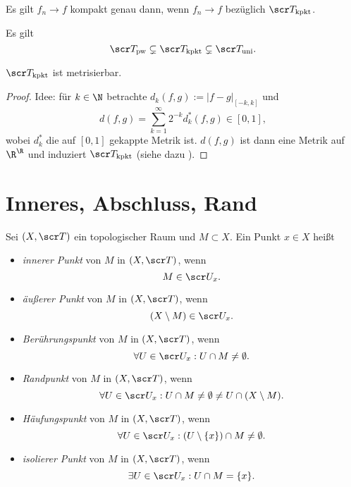 \begin{st}
	Es gilt $f_n \to f$ kompakt genau dann, wenn $f_n \to f$ bezüglich $\scr T_{\text{kpkt}}$.
\end{st}

\begin{nt}
	Es gilt
	\[
		\scr T_{\text{pw}} \subsetneq \scr T_{\text{kpkt}} \subsetneq \scr T_{\text{uni}}.
	\]
\end{nt}

\begin{st}
	$\scr T_{\text{kpkt}}$ ist metrisierbar.
	\begin{proof}
		Idee: für $k \in \N$ betrachte $d_k(f,g) := |f-g|_{[-k,k]}$ und
		\[
			d(f,g) = \sum_{k=1}^\infty 2^{-k} d_k^* (f,g) \in [0,1],
		\]
		wobei $d_k^*$ die auf $[0,1]$ gekappte Metrik ist.
		$d(f,g)$ ist dann eine Metrik auf $\R^\R$ und induziert $\scr T_{\text{kpkt}}$ (siehe dazu ).
	\end{proof}
\end{st}


\section{Inneres, Abschluss, Rand}


Sei $(X, \scr T)$ ein topologischer Raum und $M \subset X$.
Ein Punkt $x \in X$ heißt
\begin{itemize}
	\item
		\emph{innerer Punkt} von $M$ in $(X,\scr T)$, wenn
		\[
			M \in \scr U_x.
		\]
	\item
		\emph{äußerer Punkt} von $M$ in $(X,\scr T)$, wenn
		\[
			(X \setminus M) \in \scr U_x.
		\]
	\item
		\emph{Berührungspunkt} von $M$ in $(X, \scr T)$, wenn
		\[
			\forall U \in \scr U_x : U \cap M \neq \emptyset.
		\]
	\item
		\emph{Randpunkt} von $M$ in $(X, \scr T)$, wenn
		\[
			\forall U \in \scr U_x : U \cap M \neq \emptyset \neq U \cap (X \setminus M).
		\]
	\item
		\emph{Häufungspunkt} von $M$ in $(X, \scr T)$, wenn
		\[
			\forall U \in \scr U_x : (U \setminus \{x\}) \cap M \neq \emptyset.
		\]
	\item
		\emph{isolierer Punkt} von $M$ in $(X, \scr T)$, wenn
		\[
			\exists U \in \scr U_x : U \cap M = \{x\}.
		\]
\end{itemize}

